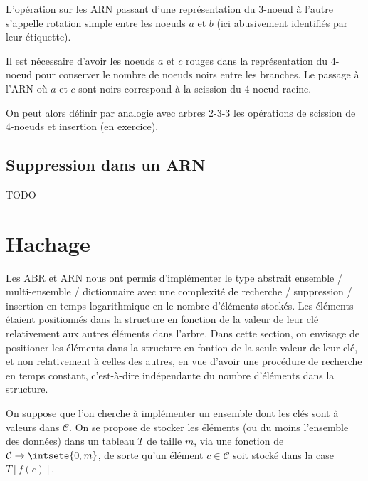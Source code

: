 \documentclass{scrartcl}
\begin{document}
			\rem L'opération sur les ARN passant d'une représentation du 3-noeud à l'autre s'appelle rotation simple entre les noeuds $a$ et $b$ (ici abusivement identifiés par leur étiquette).

			\rem Il est nécessaire d'avoir les noeuds $a$ et $c$ rouges dans la représentation du 4-noeud pour conserver le nombre de noeuds noirs entre les branches.
				Le passage à l'ARN où $a$ et $c$ sont noirs correspond à la scission du 4-noeud racine.

			On peut alors définir par analogie avec arbres 2-3-3 les opérations de scission de 4-noeuds et insertion (en exercice).

		\subsection{Suppression dans un ARN}
			TODO

	\section{Hachage}
		Les ABR et ARN nous ont permis d'implémenter le type abstrait ensemble / multi-ensemble / dictionnaire avec une complexité de recherche / suppression / insertion en temps logarithmique en le nombre d'éléments stockés. Les éléments étaient positionnés dans la structure en fonction de la valeur de leur clé relativement aux autres éléments dans l'arbre. Dans cette section, on envisage de positioner les éléments dans la structure en fontion de la seule valeur de leur clé, et non relativement à celles des autres, en vue d'avoir une procédure de recherche en temps constant, c'est-à-dire indépendante du nombre d'éléments dans la structure.

		On suppose que l'on cherche à implémenter un ensemble dont les clés sont à valeurs dans $\mathcal{C}$. On se propose de stocker les éléments (ou du moins l'ensemble des données) dans un tableau $T$ de taille $m$, via une fonction de $\mathcal{C} \rightarrow \intsete{0,m}$, de sorte qu'un élément $c \in \mathcal{C}$ soit stocké dans la case $T[f(c)]$.
\end{document}
